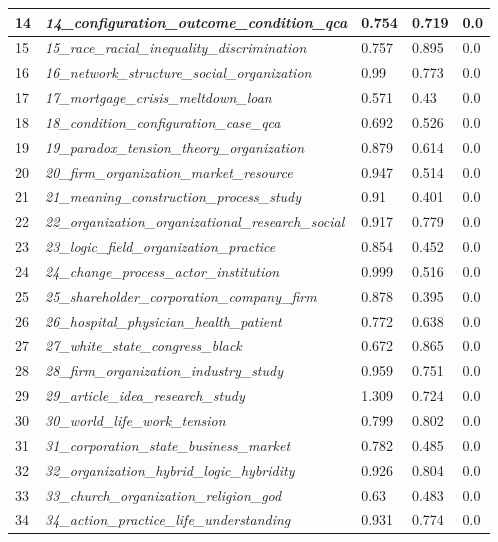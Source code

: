 \documentclass[12pt]{article}
\begin{document}
\begin{longtable}{|l|l|l|l|l|}
14 & \textit{14\_configuration\_outcome\_condition\_qca} & 0.754 & 0.719 & 0.0 \\ \hline
15 & \textit{15\_race\_racial\_inequality\_discrimination} & 0.757 & 0.895 & 0.0 \\ \hline
16 & \textit{16\_network\_structure\_social\_organization} & 0.99 & 0.773 & 0.0 \\ \hline
17 & \textit{17\_mortgage\_crisis\_meltdown\_loan} & 0.571 & 0.43 & 0.0 \\ \hline
18 & \textit{18\_condition\_configuration\_case\_qca} & 0.692 & 0.526 & 0.0 \\ \hline
19 & \textit{19\_paradox\_tension\_theory\_organization} & 0.879 & 0.614 & 0.0 \\ \hline
20 & \textit{20\_firm\_organization\_market\_resource} & 0.947 & 0.514 & 0.0 \\ \hline
21 & \textit{21\_meaning\_construction\_process\_study} & 0.91 & 0.401 & 0.0 \\ \hline
22 & \textit{22\_organization\_organizational\_research\_social} & 0.917 & 0.779 & 0.0 \\ \hline
23 & \textit{23\_logic\_field\_organization\_practice} & 0.854 & 0.452 & 0.0 \\ \hline
24 & \textit{24\_change\_process\_actor\_institution} & 0.999 & 0.516 & 0.0 \\ \hline
25 & \textit{25\_shareholder\_corporation\_company\_firm} & 0.878 & 0.395 & 0.0 \\ \hline
26 & \textit{26\_hospital\_physician\_health\_patient} & 0.772 & 0.638 & 0.0 \\ \hline
27 & \textit{27\_white\_state\_congress\_black} & 0.672 & 0.865 & 0.0 \\ \hline
28 & \textit{28\_firm\_organization\_industry\_study} & 0.959 & 0.751 & 0.0 \\ \hline
29 & \textit{29\_article\_idea\_research\_study} & 1.309 & 0.724 & 0.0 \\ \hline
30 & \textit{30\_world\_life\_work\_tension} & 0.799 & 0.802 & 0.0 \\ \hline
31 & \textit{31\_corporation\_state\_business\_market} & 0.782 & 0.485 & 0.0 \\ \hline
32 & \textit{32\_organization\_hybrid\_logic\_hybridity} & 0.926 & 0.804 & 0.0 \\ \hline
33 & \textit{33\_church\_organization\_religion\_god} & 0.63 & 0.483 & 0.0 \\ \hline
34 & \textit{34\_action\_practice\_life\_understanding} & 0.931 & 0.774 & 0.0 \\ \hline

\end{longtable}
\end{document}
